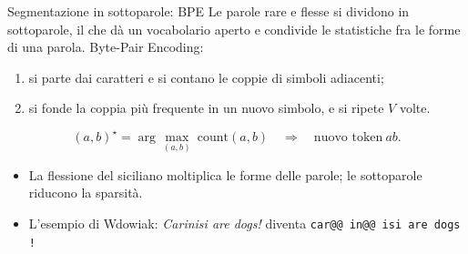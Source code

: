 \documentclass[aspectratio=169]{beamer}
\newcommand{\T}[2]{#2}
\newcommand{\T}[2]{#1}
\begin{document}
\begin{frame}{\T{Subword segmentation: BPE}{Segmentazione in sottoparole: BPE}}
  \T{Rare and inflected words are split into subword units, which gives an open vocabulary and
  shares statistics across the forms of a word. Byte-Pair Encoding:}%
  {Le parole rare e flesse si dividono in sottoparole, il che d\`a un vocabolario aperto e
  condivide le statistiche fra le forme di una parola. Byte-Pair Encoding:}
  \begin{enumerate}
    \item \T{start from characters and count the adjacent pairs of symbols;}%
          {si parte dai caratteri e si contano le coppie di simboli adiacenti;}
    \item \T{merge the most frequent pair into a new symbol, and repeat $V$ times.}%
          {si fonde la coppia pi\`u frequente in un nuovo simbolo, e si ripete $V$ volte.}
  \end{enumerate}
  \[
    (a,b)^\star=\arg\max_{(a,b)}\ \mathrm{count}(a,b)\quad\Longrightarrow\quad
    \text{\T{add the token}{nuovo token}}\ ab .
  \]
  \begin{itemize}
    \item \T{Sicilian inflection multiplies the word forms; subwords reduce the sparsity.}%
          {La flessione del siciliano moltiplica le forme delle parole; le sottoparole
          riducono la sparsit\`a.}
    \item \T{Wdowiak's example: \emph{Carinisi are dogs!} becomes
          \texttt{car@@ in@@ isi are dogs !}}%
          {L'esempio di Wdowiak: \emph{Carinisi are dogs!} diventa
          \texttt{car@@ in@@ isi are dogs !}}
  \end{itemize}
\end{frame}
\end{document}
